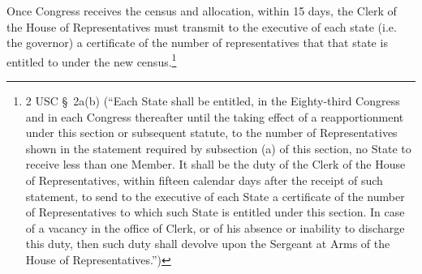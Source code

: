 Once Congress receives the census and allocation, within 15 days, the Clerk of the House of Representatives must transmit to the executive of each state (i.e. the governor) a certificate of the number of representatives that that state is entitled to under the new census.\footnote{2 USC \S\ 2a(b) (``Each State shall be entitled, in the Eighty-third Congress and in each Congress thereafter until the taking effect of a reapportionment under this section or subsequent statute, to the number of Representatives shown in the statement required by subsection (a) of this section, no State to receive less than one Member. It shall be the duty of the Clerk of the House of Representatives, within fifteen calendar days after the receipt of such statement, to send to the executive of each State a certificate of the number of Representatives to which such State is entitled under this section. In case of a vacancy in the office of Clerk, or of his absence or inability to discharge this duty, then such duty shall devolve upon the Sergeant at Arms of the House of Representatives.'')}
